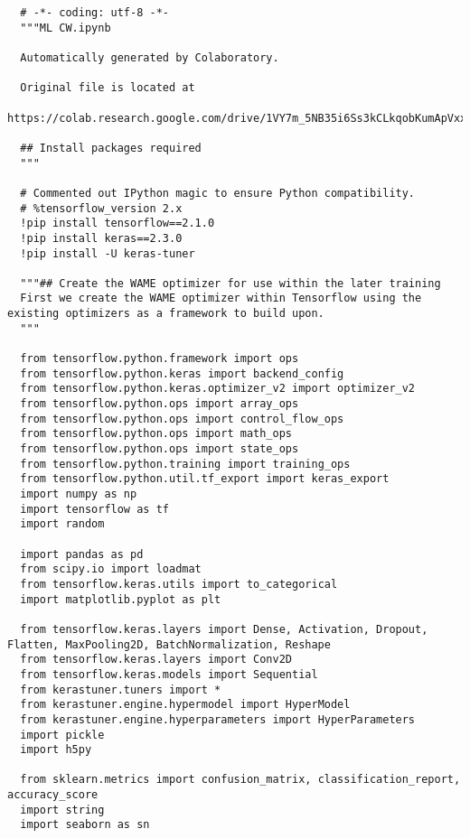 \documentclass[12pt]{article}
\numberwithin{equation}{section}
\numberwithin{figure}{section}
\numberwithin{table}{section}
\begin{document}
\begin{lstlisting}
  # -*- coding: utf-8 -*-
  """ML CW.ipynb
  
  Automatically generated by Colaboratory.
  
  Original file is located at
      https://colab.research.google.com/drive/1VY7m_5NB35i6Ss3kCLkqobKumApVxxE_
  
  ## Install packages required
  """
  
  # Commented out IPython magic to ensure Python compatibility.
  # %tensorflow_version 2.x
  !pip install tensorflow==2.1.0
  !pip install keras==2.3.0
  !pip install -U keras-tuner
  
  """## Create the WAME optimizer for use within the later training
  First we create the WAME optimizer within Tensorflow using the existing optimizers as a framework to build upon.
  """
  
  from tensorflow.python.framework import ops
  from tensorflow.python.keras import backend_config
  from tensorflow.python.keras.optimizer_v2 import optimizer_v2
  from tensorflow.python.ops import array_ops
  from tensorflow.python.ops import control_flow_ops
  from tensorflow.python.ops import math_ops
  from tensorflow.python.ops import state_ops
  from tensorflow.python.training import training_ops
  from tensorflow.python.util.tf_export import keras_export
  import numpy as np
  import tensorflow as tf
  import random
  
  import pandas as pd
  from scipy.io import loadmat 
  from tensorflow.keras.utils import to_categorical
  import matplotlib.pyplot as plt
  
  from tensorflow.keras.layers import Dense, Activation, Dropout, Flatten, MaxPooling2D, BatchNormalization, Reshape
  from tensorflow.keras.layers import Conv2D
  from tensorflow.keras.models import Sequential
  from kerastuner.tuners import *
  from kerastuner.engine.hypermodel import HyperModel
  from kerastuner.engine.hyperparameters import HyperParameters
  import pickle
  import h5py
  
  from sklearn.metrics import confusion_matrix, classification_report, accuracy_score
  import string
  import seaborn as sn
  

\end{lstlisting}
\end{document}
